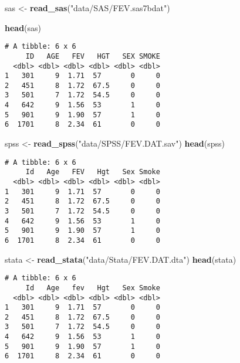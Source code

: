 \documentclass[]{book}
\newenvironment{Shaded}{\begin{snugshade}}{\end{snugshade}}
\newcommand{\KeywordTok}[1]{\textcolor[rgb]{0.13,0.29,0.53}{\textbf{#1}}}
\newcommand{\StringTok}[1]{\textcolor[rgb]{0.31,0.60,0.02}{#1}}
\newcommand{\NormalTok}[1]{#1}
\theoremstyle{definition}
\theoremstyle{definition}
\theoremstyle{definition}
\theoremstyle{remark}
\begin{document}
\begin{Shaded}
\begin{Highlighting}[]
\NormalTok{sas <-}\StringTok{ }\KeywordTok{read_sas}\NormalTok{(}\StringTok{"data/SAS/FEV.sas7bdat"}\NormalTok{)}

\KeywordTok{head}\NormalTok{(sas)}
\end{Highlighting}
\end{Shaded}

\begin{verbatim}
# A tibble: 6 x 6
     ID   AGE   FEV   HGT   SEX SMOKE
  <dbl> <dbl> <dbl> <dbl> <dbl> <dbl>
1   301     9  1.71  57       0     0
2   451     8  1.72  67.5     0     0
3   501     7  1.72  54.5     0     0
4   642     9  1.56  53       1     0
5   901     9  1.90  57       1     0
6  1701     8  2.34  61       0     0
\end{verbatim}

\begin{Shaded}
\begin{Highlighting}[]
\NormalTok{spss <-}\StringTok{ }\KeywordTok{read_spss}\NormalTok{(}\StringTok{"data/SPSS/FEV.DAT.sav"}\NormalTok{)}
\KeywordTok{head}\NormalTok{(spss)}
\end{Highlighting}
\end{Shaded}

\begin{verbatim}
# A tibble: 6 x 6
     Id   Age   FEV   Hgt   Sex Smoke
  <dbl> <dbl> <dbl> <dbl> <dbl> <dbl>
1   301     9  1.71  57       0     0
2   451     8  1.72  67.5     0     0
3   501     7  1.72  54.5     0     0
4   642     9  1.56  53       1     0
5   901     9  1.90  57       1     0
6  1701     8  2.34  61       0     0
\end{verbatim}

\begin{Shaded}
\begin{Highlighting}[]
\NormalTok{stata <-}\StringTok{ }\KeywordTok{read_stata}\NormalTok{(}\StringTok{"data/Stata/FEV.DAT.dta"}\NormalTok{)}
\KeywordTok{head}\NormalTok{(stata)}
\end{Highlighting}
\end{Shaded}

\begin{verbatim}
# A tibble: 6 x 6
     Id   Age   fev   Hgt   Sex Smoke
  <dbl> <dbl> <dbl> <dbl> <dbl> <dbl>
1   301     9  1.71  57       0     0
2   451     8  1.72  67.5     0     0
3   501     7  1.72  54.5     0     0
4   642     9  1.56  53       1     0
5   901     9  1.90  57       1     0
6  1701     8  2.34  61       0     0
\end{verbatim}
\end{document}
